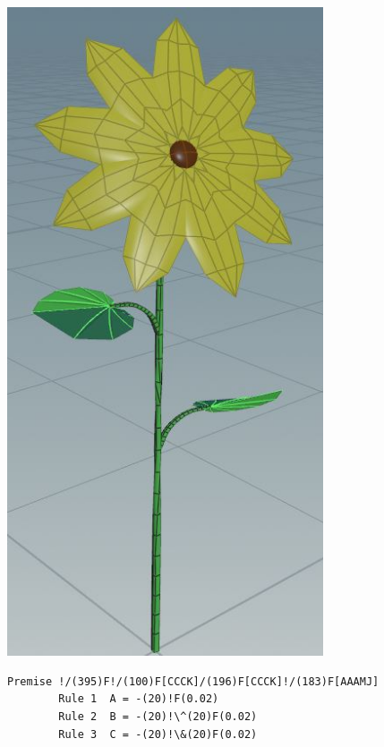 \documentclass[paper=a4,fontsize=12pt,ngerman]{scrartcl}
\begin{document}
	\begin{minipage}{0.3\textwidth}
		\includegraphics[width=0.7\textwidth]{graphics/flowerthree1.JPG}
	\end{minipage}
	\begin{minipage}{0.7\textwidth}
	\begin{lstlisting}[caption={Flower Three},basicstyle=\scriptsize]
		Premise !/(395)F!/(100)F[CCCK]/(196)F[CCCK]!/(183)F[AAAMJ]
		Rule 1	A = -(20)!F(0.02)
		Rule 2	B = -(20)!\^(20)F(0.02)
		Rule 3	C = -(20)!\&(20)F(0.02)
	\end{lstlisting} 
	\end{minipage}
\end{document}

